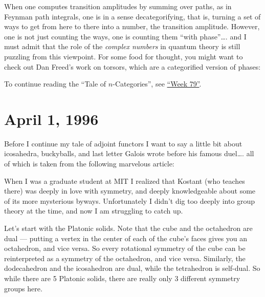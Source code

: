 \documentclass{article}
\def\tightlist{}
\renewcommand{\texttt}[1]{%
  \begingroup
  \ttfamily
  \begingroup\lccode`~=`/\lowercase{\endgroup\def~}{/\discretionary{}{}{}}%
  \begingroup\lccode`~=`[\lowercase{\endgroup\def~}{[\discretionary{}{}{}}%
  \begingroup\lccode`~=`.\lowercase{\endgroup\def~}{.\discretionary{}{}{}}%
  \catcode`/=\active\catcode`[=\active\catcode`.=\active
  \scantokens{#1\noexpand}%
  \endgroup
}
\begin{document}
When one computes transition amplitudes by summing over paths, as in
Feynman path integrals, one is in a sense decategorifying, that is,
turning a set of ways to get from here to there into a number, the
transition amplitude. However, one is not just counting the ways, one is
counting them ``with phase''\ldots. and I must admit that the role of
the \emph{complex numbers} in quantum theory is still puzzling from this
viewpoint. For some food for thought, you might want to check out Dan
Freed's work on torsors, which are a categorified version of phases:


To continue reading the ``Tale of \(n\)-Categories'', see
\protect\hyperlink{week79}{``Week 79''}.



\hypertarget{week79}{%
\section{April 1, 1996}\label{week79}}

Before I continue my tale of adjoint functors I want to say a little bit
about icosahedra, buckyballs, and last letter Galois wrote before his
famous duel\ldots. all of which is taken from the following marvelous
article:


When I was a graduate student at MIT I realized that Kostant (who
teaches there) was deeply in love with symmetry, and deeply
knowledgeable about some of its more mysterious byways. Unfortunately I
didn't dig too deeply into group theory at the time, and now I am
struggling to catch up.

Let's start with the Platonic solids. Note that the cube and the
octahedron are dual --- putting a vertex in the center of each of the
cube's faces gives you an octahedron, and vice versa. So every
rotational symmetry of the cube can be reinterpreted as a symmetry of
the octahedron, and vice versa. Similarly, the dodecahedron and the
icosahedron are dual, while the tetrahedron is self-dual. So while there
are 5 Platonic solids, there are really only 3 different symmetry groups
here.
\end{document}
